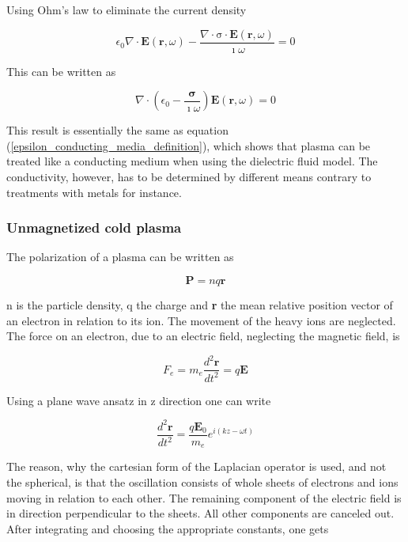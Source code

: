 \documentclass[a4paper,11pt]{thesis}
\begin{document}
Using Ohm's law to eliminate the current density

\begin{equation}
    \epsilon_0  \nabla \cdot \mathbf{E}(\mathbf{r},\omega)-\frac{\nabla \cdot \mathrm{\sigma } \cdot \mathbf{E}(\mathbf{r},\omega)}{\imath \omega}=0
\end{equation}

This can be written as

\begin{equation}
    \nabla \cdot \left( \epsilon_0 -\frac{\mathbf{\sigma } }{\imath \omega}  \right) \mathbf{E}(\mathbf{r},\omega)=0
\end{equation}

This result is essentially the same as equation (\ref{epsilon_conducting_media_definition}), which shows that plasma can be treated like a conducting medium when using the dielectric fluid model. The conductivity, however, has to be determined by different means contrary to treatments with metals for instance.

\subsubsection{Unmagnetized cold plasma}
The polarization of a plasma can be written as

\begin{equation}\label{polarization}
    \mathbf{P}=nq\mathbf{r}
\end{equation}

n is the particle density, q the charge and \textbf{r} the mean relative position vector of an electron in relation to its ion. The movement of the heavy ions are neglected. The force on an electron, due to an electric field, neglecting the magnetic field, is

\begin{equation}
    F_e=m_e\frac{d^2\mathbf{r}}{dt^2}=q\mathbf{E}
\end{equation}

Using a plane wave ansatz in z direction one can write

\begin{equation}
    \frac{d^2\mathbf{r}}{dt^2}=\frac{q \mathbf{E}_0}{m_e} e^{i(kz-\omega t)}
\end{equation}

The reason, why the cartesian form of the Laplacian operator is used, and not the spherical, is that the oscillation consists of whole sheets of electrons and ions moving in relation to each other. The remaining component of the electric field is in direction perpendicular to the sheets. All other components are canceled out. After integrating and choosing the appropriate constants, one gets
\end{document}
